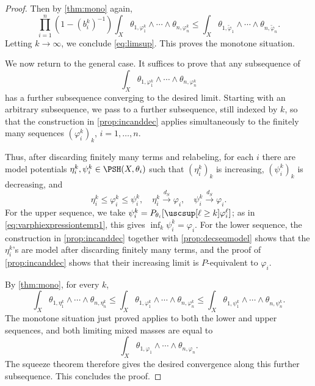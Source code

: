 \begin{proof}
Then by \cref{thm:mono} again,
\[
	\prod_{i=1}^n\left(1-(b^k_i)^{-1}\right)\int_X \theta_{1,\varphi_1^k}\wedge\cdots\wedge\theta_{n,\varphi_n^k}\leq \int_X \theta_{1,\tilde{\varphi}_1}\wedge\cdots\wedge\theta_{n,\tilde{\varphi}_n}.
\]
Letting $k\to\infty$, we conclude \eqref{eq:limsup}. This proves the monotone situation.

We now return to the general case. It suffices to prove that any subsequence of
\[
\int_X \theta_{1,\varphi_1^k}\wedge\cdots\wedge\theta_{n,\varphi_n^k}
\]
has a further subsequence converging to the desired limit. Starting with an arbitrary subsequence, we pass to a further subsequence, still indexed by $k$, so that the construction in \cref{prop:incanddec} applies simultaneously to the finitely many sequences $(\varphi_i^k)_k$, $i=1,\ldots,n$.

Thus, after discarding finitely many terms and relabeling, for each $i$ there are model potentials $\eta_i^k,\psi_i^k\in \PSH(X,\theta_i)$ such that $(\eta_i^k)_k$ is increasing, $(\psi_i^k)_k$ is decreasing, and
\[
\eta_i^k\leq \varphi_i^k\leq \psi_i^k,\quad
\eta_i^k\xrightarrow{d_S}\varphi_i,\quad
\psi_i^k\xrightarrow{d_S}\varphi_i.
\]
For the upper sequence, we take $\psi_i^k=P_{\theta_i}[\uscsup[\ell\geq k]\varphi_i^\ell]$; as in \eqref{eq:varphiexpressiontemp1}, this gives $\inf_k\psi_i^k=\varphi_i$. For the lower sequence, the construction in \cref{prop:incanddec} together with \cref{prop:decseqmodel} shows that the $\eta_i^k$'s are model after discarding finitely many terms, and the proof of \cref{prop:incanddec} shows that their increasing limit is $P$-equivalent to $\varphi_i$.

By \cref{thm:mono}, for every $k$,
\[
\int_X\theta_{1,\eta_1^k}\wedge\cdots\wedge\theta_{n,\eta_n^k}
\leq
\int_X\theta_{1,\varphi_1^k}\wedge\cdots\wedge\theta_{n,\varphi_n^k}
\leq
\int_X\theta_{1,\psi_1^k}\wedge\cdots\wedge\theta_{n,\psi_n^k}.
\]
The monotone situation just proved applies to both the lower and upper sequences, and both limiting mixed masses are equal to
\[
\int_X\theta_{1,\varphi_1}\wedge\cdots\wedge\theta_{n,\varphi_n}.
\]
The squeeze theorem therefore gives the desired convergence along this further subsequence. This concludes the proof.
\end{proof}


